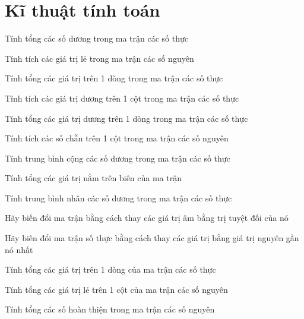 \section{Kĩ thuật tính toán}
\begin{problem}
    Tính tổng các số dương trong ma trận các số thực
\end{problem}
\begin{problem}
    Tính tích các giá trị lẻ trong ma trận các số nguyên
\end{problem}
\begin{problem}
     Tính tổng các giá trị trên 1 dòng trong ma trận các số thực
\end{problem}
\begin{problem}
    Tính tích các giá trị dương trên 1 cột trong ma trận các số thực
\end{problem}
\begin{problem}
    Tính tổng các giá trị dương trên 1 dòng trong ma trận các số thực
\end{problem}
\begin{problem}
    Tính tích các số chẵn trên 1 cột trong ma trận các số nguyên
\end{problem}
\begin{problem}
    Tính trung bình cộng các số dương trong ma trận các số thực
\end{problem}
\begin{problem}
    Tính tổng các giá trị nằm trên biên của ma trận
\end{problem}
\begin{problem}
    Tính trung bình nhân các số dương trong ma trận các số thực
\end{problem}
\begin{problem}
    Hãy biến đổi ma trận bằng cách thay các giá trị âm bằng trị tuyệt đối của nó
\end{problem}
\begin{problem}
    Hãy biên đổi ma trận số thực bằng cách thay các giá trị bằng giá trị nguyên gần nó nhất
\end{problem}
\begin{problem}
    Tính tổng các giá trị trên 1 dòng của ma trận các số thực
\end{problem}
\begin{problem}
    Tính tổng các giá trị lẻ trên 1 cột của ma trận các số nguyên
\end{problem}
\begin{problem}
    Tính tổng các số hoàn thiện trong ma trận các số nguyên
\end{problem}



